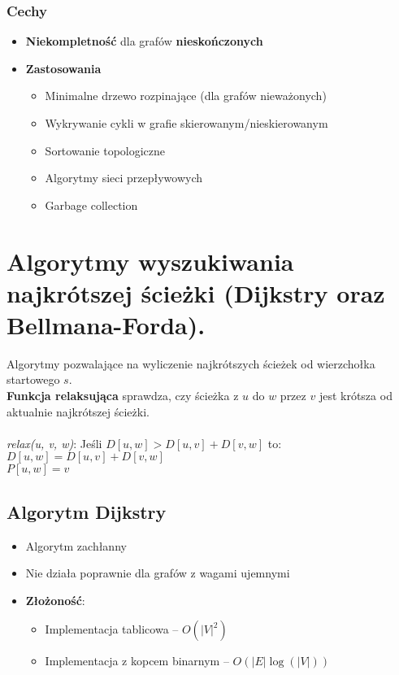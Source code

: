 \documentclass[main.tex]{subfiles}
\begin{document}
    \subsubsection{Cechy}

    \begin{itemize}[noitemsep]
        \item \textbf{Niekompletność} dla grafów \textbf{nieskończonych}
        \item \textbf{Zastosowania}
        \begin{itemize}[noitemsep]
            \item Minimalne drzewo rozpinające (dla grafów nieważonych)
            \item Wykrywanie cykli w grafie skierowanym/nieskierowanym
            \item Sortowanie topologiczne
            \item Algorytmy sieci przepływowych
            \item Garbage collection
        \end{itemize}
    \end{itemize}


    \section{Algorytmy wyszukiwania najkrótszej ścieżki (Dijkstry oraz Bellmana-Forda).}
    Algorytmy pozwalające na wyliczenie najkrótszych ścieżek od wierzchołka startowego $s$.\\

    \noindent \textbf{Funkcja relaksująca} sprawdza, czy ścieżka z $u$ do $w$ przez $v$ jest krótsza od aktualnie
    najkrótszej ścieżki.
    \\~\\
    \textit{relax(u, v, w)}:
    \vskip 0pt Jeśli $D[u, w] > D[u, v] + D[v, w]$ to:\\
    \hspace*{1cm} $D[u, w] = D[u, v] + D[v, w]$\\
    \hspace*{1cm} $P[u, w] = v$\\

    \subsection{Algorytm Dijkstry}

    \begin{itemize}[noitemsep]
        \item Algorytm zachłanny
        \item Nie działa poprawnie dla grafów z wagami ujemnymi
        \item \textbf{Złożoność}:
        \begin{itemize}[noitemsep]
            \item Implementacja tablicowa -- $O(|V|^2)$
            \item Implementacja z kopcem binarnym -- $O(|E|\log(|V|))$
        \end{itemize}
    \end{itemize}
\end{document}
